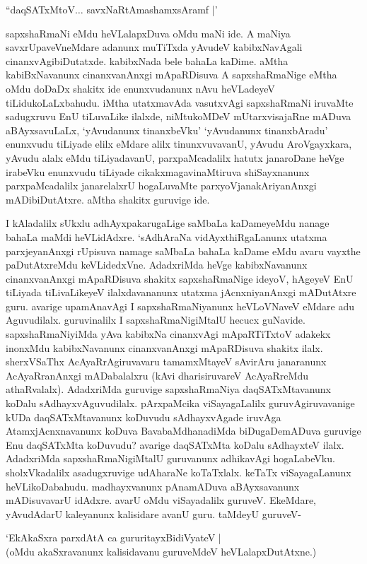 \begin{shloka}
``daqSATxMtoV$\ldots$ savxNaRtAmashamxsAramf |'
\end{shloka}

sapxshaRmaNi eMdu heVLalapxDuva oMdu maNi ide. A maNiya savxrUpaveVneMdare adanunx muTiTxda yAvudeV kabibxNavAgali cinanxvAgibiDutatxde. kabibxNada bele bahaLa kaDime. aMtha kabiBxNavanunx cinanxvanAnxgi mApaRDisuva A sapxshaRmaNige eMtha oMdu doDaDx shakitx ide enunxvudanunx nAvu heVLadeyeV tiLidukoLaLxbahudu. iMtha utatxmavAda vasutxvAgi sapxshaRmaNi iruvaMte sadugxruvu EnU tiLuvaLike ilalxde, niMtukoMDeV mUtarxvisajaRne mADuva aBAyxsavuLaLx, `yAvudanunx tinanxbeVku' `yAvudanunx tinanxbAradu' enunxvudu tiLiyade elilx eMdare alilx tinunxvuvavanU, yAvudu AroVgayxkara, yAvudu alalx eMdu tiLiyadavanU, parxpaMcadalilx hatutx janaroDane heVge irabeVku enunxvudu tiLiyade cikakxmagavinaMtiruva shiSayxnanunx parxpaMcadalilx janarelalxrU hogaLuvaMte parxyoVjanakAriyanAnxgi mADibiDutAtxre. aMtha shakitx guruvige ide.

I kAladalilx sUkxlu adhAyxpakarugaLige saMbaLa kaDameyeMdu nanage bahaLa maMdi heVLidAdxre. `sAdhAraNa vidAyxthiRgaLanunx utatxma parxjeyanAnxgi rUpisuva namage saMbaLa bahaLa kaDame eMdu avaru vayxthe paDutAtxreMdu keVLidedxVne. AdadxriMda heVge kabibxNavanunx cinanxvanAnxgi mApaRDisuva shakitx sapxshaRmaNige ideyoV, hAgeyeV EnU tiLiyada tiLivaLikeyeV ilalxdavananunx utatxma jAcnxniyanAnxgi mADutAtxre guru. avarige upamAnavAgi I sapxshaRmaNiyanunx heVLoVNaveV eMdare adu Aguvudilalx. guruvinalilx I sapxshaRmaNigiMtalU hecucx guNavide. sapxshaRmaNiyiMda yAva kabibxNa cinanxvAgi mApaRTiTxtoV adakekx inonxMdu kabibxNavanunx cinanxvanAnxgi mApaRDisuva shakitx ilalx. sherxVSaThx AcAyaRrAgiruvavaru tamamxMtayeV sAvirAru janaranunx AcAyaRranAnxgi mADabalalxru (kAvi dharisiruvareV AcAyaRreMdu athaRvalalx). AdadxriMda guruvige sapxshaRmaNiya daqSATxMtavanunx koDalu sAdhayxvAguvudilalx. pArxpaMcika viSayagaLalilx guruvAgiruvavanige kUDa daqSATxMtavanunx koDuvudu sAdhayxvAgade iruvAga AtamxjAcnxnavanunx koDuva BavabaMdhanadiMda biDugaDemADuva guruvige Enu daqSATxMta koDuvudu? avarige daqSATxMta koDalu sAdhayxteV ilalx. AdadxriMda sapxshaRmaNigiMtalU guruvanunx adhikavAgi hogaLabeVku. sholxVkadalilx asadugxruvige udAharaNe koTaTxlalx. keTaTx viSayagaLanunx heVLikoDabahudu. madhayxvanunx pAnamADuva aBAyxsavanunx mADisuvavarU idAdxre. avarU oMdu viSayadalilx guruveV. EkeMdare, yAvudAdarU kaleyanunx kalisidare avanU guru. taMdeyU guruveV-

\begin{shloka}
`EkAkaSxra parxdAtA ca gururitayxBidiVyateV |\\
(oMdu akaSxravanunx kalisidavanu guruveMdeV heVLalapxDutAtxne.)
\end{shloka} 

